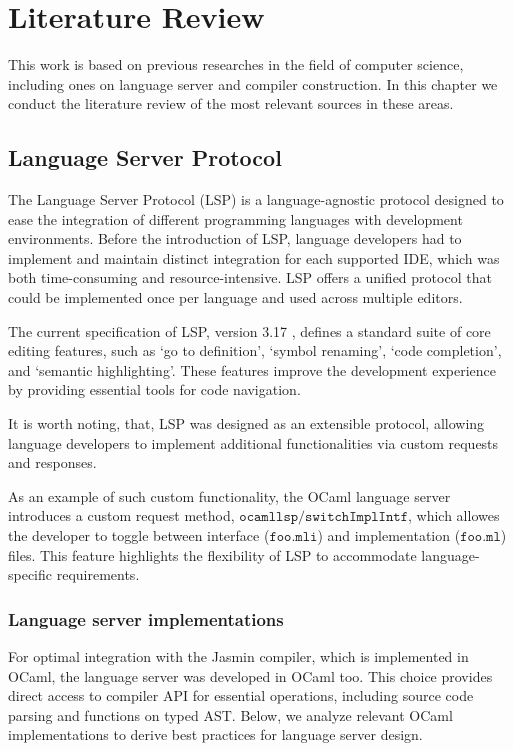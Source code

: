 \chapter{Literature Review}
\label{chap:background}

This work is based on previous researches in the field of computer science,
including ones on language server and compiler construction. In this
chapter we conduct the literature review of the most relevant sources in these areas.

\section{Language Server Protocol}

The Language Server Protocol (LSP) is a language-agnostic protocol designed to
ease the integration of different programming languages with development
environments. Before the introduction of LSP, language developers had to 
implement and maintain distinct integration for each supported IDE, which was
both time-consuming and resource-intensive. LSP offers a unified protocol that
could be implemented once per language and used across multiple editors.

The current specification of LSP, version 3.17
\cite{language-server-protocol:2016}, defines a standard suite of core editing
features, such as `go to definition', `symbol renaming', `code completion', and
`semantic highlighting'. These features improve the development experience by
providing essential tools for code navigation. 

It is worth noting, that, LSP was designed as an extensible protocol, allowing
language developers to implement additional functionalities via custom requests
and responses.

As an example of such custom functionality, the OCaml language
server~\cite{opam-ocaml-lsp} introduces a custom request method,
$\texttt{ocamllsp/switchImplIntf}$, which allowes the developer to toggle
between interface ($\texttt{foo.mli}$) and implementation ($\texttt{foo.ml}$)
files. This feature highlights the flexibility of LSP to accommodate
language-specific requirements.


\subsection{Language server implementations}
\label{sec:background:implementations}

For optimal integration with the Jasmin compiler, which is implemented in OCaml,
the language server was developed in OCaml too. This choice provides direct
access to compiler API for essential operations, including source code parsing
and functions on typed AST. Below, we analyze relevant OCaml implementations to
derive best practices for language server design.  

